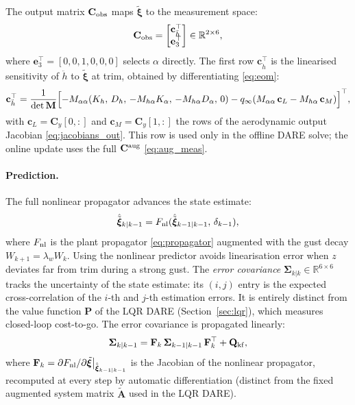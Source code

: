 \documentclass[11pt,a4paper]{article}
\newcommand{\vxi}{\bm{\xi}}
\newcommand{\mA}{\mathbf{A}}
\newcommand{\mC}{\mathbf{C}}
\begin{document}
The output matrix $\mathbf{C}_{\rm obs}$ maps $\tilde{\vxi}$ to the measurement
space:
\begin{equation}
  \mathbf{C}_{\rm obs} =
  \begin{bmatrix}
    \mathbf{c}_{\ddot{h}}^\top \\
    \mathbf{e}_3^\top
  \end{bmatrix}
  \in \mathbb{R}^{2\times6},
  \label{eq:C_obs}
\end{equation}
where $\mathbf{e}_3^\top = [0,0,1,0,0,0]$ selects $\alpha$ directly.
The first row $\mathbf{c}_{\ddot{h}}^\top$ is the linearised sensitivity of
$\ddot{h}$ to $\tilde{\vxi}$ at trim, obtained by differentiating
\eqref{eq:eom}:
\begin{equation}
  \mathbf{c}_{\ddot{h}}^\top =
  \frac{1}{\det\mathbf{M}}\Bigl[
    -M_{\alpha\alpha}(K_h,\,D_h,\,-M_{h\alpha}K_\alpha,\,-M_{h\alpha}D_\alpha,\,0)
    - q_\infty(M_{\alpha\alpha}\,\mathbf{c}_{L} - M_{h\alpha}\,\mathbf{c}_{M})
  \Bigr]^\top,
  \label{eq:c_hddot}
\end{equation}
with $\mathbf{c}_L = \mC_y[0,:]$ and $\mathbf{c}_M = \mC_y[1,:]$ the rows of
the aerodynamic output Jacobian \eqref{eq:jacobians_out}.
This row is used only in the offline DARE solve; the online update uses the
full $\mathbf{C}^{\rm aug}$ \eqref{eq:aug_meas}.

\paragraph{Prediction.}
The full nonlinear propagator advances the state estimate:
\begin{equation}
  \hat{\tilde{\vxi}}_{k|k-1} = F_{\rm nl}(\hat{\tilde{\vxi}}_{k-1|k-1},\,\delta_{k-1}),
  \label{eq:ekf_pred}
\end{equation}
where $F_{\rm nl}$ is the plant propagator \eqref{eq:propagator} augmented with
the gust decay $W_{k+1} = \lambda_w W_k$.
Using the nonlinear predictor avoids linearisation error when $z$ deviates far
from trim during a strong gust.
The \emph{error covariance} $\boldsymbol{\Sigma}_{k|k} \in \mathbb{R}^{6\times6}$ tracks
the uncertainty of the state estimate: its $(i,j)$ entry is the expected
cross-correlation of the $i$-th and $j$-th estimation errors.
It is entirely distinct from the value function $\mathbf{P}$ of the LQR DARE
(Section~\ref{sec:lqr}), which measures closed-loop cost-to-go.
The error covariance is propagated linearly:
\begin{equation}
  \boldsymbol{\Sigma}_{k|k-1} = \mathbf{F}_k\,\boldsymbol{\Sigma}_{k-1|k-1}\,\mathbf{F}_k^\top + \mathbf{Q}_{\rm kf},
  \label{eq:ekf_cov_pred}
\end{equation}
where $\mathbf{F}_k = \partial F_{\rm nl}/\partial\tilde{\vxi}\big|_{\hat{\tilde{\vxi}}_{k-1|k-1}}$
is the Jacobian of the nonlinear propagator, recomputed at every step by automatic
differentiation (distinct from the fixed augmented system matrix $\tilde{\mA}$
used in the LQR DARE).
\end{document}
